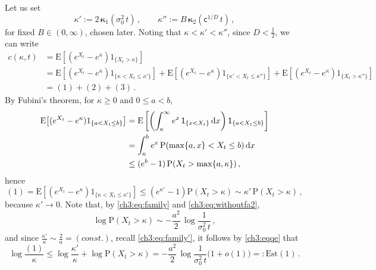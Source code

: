 \documentclass[a4paper,reqno,11pt]{amsart}
\numberwithin{equation}{section}
\newcommand{\dd}{\text{\rm d}}             %
\newcommand{\PEfont}{\mathrm}
\renewcommand{\P}{\ensuremath{\PEfont P}}
\newcommand{\E}{\ensuremath{\PEfont E}}
\newcommand{\ind}{{\sf 1}}
\newcommand\sfc{\mathsf{c}}
\def\dd{\mathrm{d}}
\newcommand\bkappa{\boldsymbol{\kappa}}
\begin{document}
Let us set
\begin{equation}\label{ch3:eq:family'}
	\kappa' :=  2 \, \bkappa_1( \sigma_0^2 \, t) \,, \qquad
	\kappa'' := B \, \bkappa_2( \sfc^{1/D} \,  t) \,,
\end{equation}
for fixed $B \in (0,\infty)$, chosen later.
Noting that $\kappa < \kappa' < \kappa''$, since $D < \frac{1}{2}$, we can write
\begin{equation}\label{ch3:eq:upperboundcallK}
 \begin{split}
c(\kappa,t) &=\E\left[(e^{X_t}-e^{\kappa})1_{\{X_t > \kappa\}}\right]\\
&=\E\left[(e^{X_t}-e^{\kappa})1_{\{\kappa < X_t \le 
\kappa'\}}\right]
+\E\left[(e^{X_t}-e^{\kappa})1_{\{\kappa' < X_t \le
\kappa''\}}\right]  +\E\left[(e^{X_t}-e^{\kappa})1_{\{X_t>\kappa''\}}\right]\\
&=(1)+(2)+(3) \,.
 \end{split}
\end{equation}
By Fubini's theorem, for $\kappa \ge 0$ and $0 \le a < b$,
\begin{equation} \label{ch3:eq:alwaysby}
\begin{split}
	\E\big[ (e^{X_t}  - e^{\kappa})1_{\{a < X_t \le b\}}\big]
	&= \E\left[ \left( \int_\kappa^{\infty} 
	e^x \, \ind_{\{x < X_t\}} \, \dd x \right)  \ind_{\{a < X_t \le b\}} \right] \\
	& =\int_\kappa^{b} 
	e^x \, \P(\max\{a,x\} < X_t \le b) \, \dd x\\
	& \le (e^b-1) \, \P(X_t > \max\{a,\kappa\}) \,,
\end{split}
\end{equation}
hence
\begin{equation} \label{ch3:eqqe}
 (1) = \E\left[(e^{X_t}-e^{\kappa})1_{\{\kappa < X_t \le 
\kappa'\}}\right]
\leq (e^{\kappa'} - 1) \P(X_t>\kappa)
 \sim \kappa' \,\P(X_t>\kappa) \,, 
\end{equation}
because $\kappa' \to 0$.
Note that, by \eqref{ch3:eq:family} and \eqref{ch3:eq:withoutfa2},
\begin{equation} \label{ch3:eq:gonnause}
	\log \P(X_t > \kappa) \sim -
	\frac{a^2}{2}\, \log \frac{1}{ \sigma_0^2 \, t} \,,
\end{equation}
and since $\frac{\kappa'}{\kappa} \sim \frac{ 2}{a} = (const.)$,
recall \eqref{ch3:eq:family'}, it follows by \eqref{ch3:eqqe} that
\begin{equation} \label{eq:est1}
	\log \frac{(1)}{\kappa} \le 
	\log \frac{\kappa'}{\kappa} + \log \P(X_t > \kappa) =
	 - \frac{a^2}{2} \, \log \frac{1}{ \sigma_0^2 \, t} \big(1+o(1)\big)
	  =: \mathrm{Est}(1)\,.
\end{equation}
\end{document}
